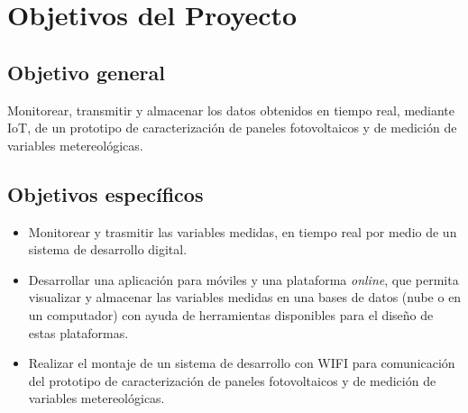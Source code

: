 \section{Objetivos del Proyecto}

\subsection{Objetivo general}

Monitorear, transmitir y almacenar los datos obtenidos en tiempo real, mediante IoT, de un prototipo de caracterización de paneles fotovoltaicos y de medición de variables metereológicas.

\subsection{Objetivos específicos}

\begin{itemize}
\item Monitorear y trasmitir las variables medidas, en tiempo real por medio de un sistema de desarrollo digital. 
\item  Desarrollar una aplicación para móviles y una plataforma \textit{online}, que permita visualizar y almacenar las variables medidas en una bases de datos (nube o en un computador) con ayuda de herramientas disponibles para el diseño de estas plataformas.
\item Realizar el montaje de un sistema de desarrollo con WIFI para comunicación del prototipo de caracterización de paneles fotovoltaicos y de medición de variables metereológicas.

\end{itemize}









